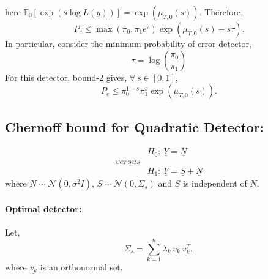 \documentclass[a4paper,english,12pt]{article}
\begin{document}
here $\mathbb{E}_0\left[\exp(s\log{L(y)})\right] =\exp\left(\mu_{T,0}(s)\right)$.
Therefore,
\begin{equation}
P_e \leq \max\left(\pi_0,\pi_1e^\tau \right) \exp\left(\mu_{T,0}(s)-s\tau\right).
\end{equation}
In particular, consider the minimum probability of error detector,
\begin{equation} \tau =\log\left(\frac{\pi_0}{\pi_1} \right) 
\end{equation}
For this detector, bound-2 gives,
$\forall \:s\in\left[ 0,1\right]$, 
\begin{equation}P_e \leq \pi_0^{1-s}\pi_1^{s}\exp\left(\mu_{T,0}\left( s\right) \right).
\end{equation}
\subsection{Chernoff bound for Quadratic Detector:}
\begin{align*}
&H_0:~\underline{Y}=\underline{N}\\
{versus}\\ 
&H_1:~\underline{Y}=\underline{S}+\underline{N}
\end{align*}
where $ \underline{N} \sim \mathcal{N}(0,\sigma^2 I)$, $ \underline{S} \sim \mathcal{N}(0,\Sigma_s)$ and $ \underline{S}$ is independent of $ \underline{N}$.
\paragraph{Optimal detector:}
Let,
\begin{equation}
\Sigma_s=\sum_{k=1}^{n}\lambda_k\, \underline{v_k}\:\underline{v_k^T},
\end{equation}
where $\underline{v_k}$ is an orthonormal set.
\end{document}
